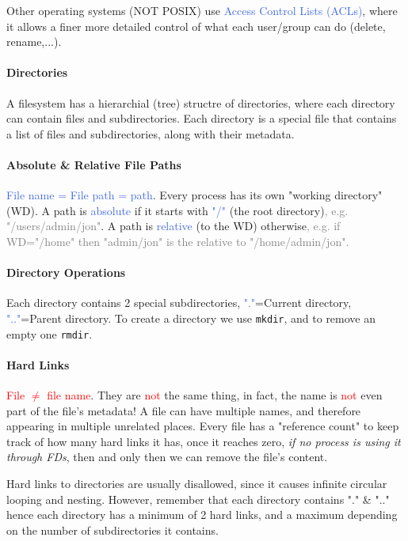 \documentclass[openany,12pt]{book}
\newcommand{\code}[1]{\texttt{#1}}
\newcommand{\red}[1]{\textcolor{Red}{#1}}
\newcommand{\blue}[1]{\textcolor{RoyalBlue}{#1}}
\newcommand{\gray}[1]{\textcolor{gray}{#1}}
\begin{document}
Other operating systems (NOT POSIX) use \blue{Access Control Lists (ACLs)}, where it allows a finer more detailed control of what each user/group can do (delete, rename,...).


\paragraph{Directories} A filesystem has a hierarchial (tree) structre of directories, where each directory can contain files and subdirectories. Each directory is a special file that contains a list of files and subdirectories, along with their metadata. 

\paragraph{Absolute \& Relative File Paths} \blue{File name = File path = path}. Every process has its own "working directory" (WD). A path is \blue{absolute} if it starts with \blue{"/"} (the root directory)\gray{, e.g. "/users/admin/jon"}. A path is \blue{relative} (to the WD) otherwise\gray{, e.g. if WD="/home" then "admin/jon" is the relative to "/home/admin/jon".}


\paragraph{Directory Operations} Each directory contains 2 special subdirectories, \blue{"."}=Current directory, \blue{".."}=Parent directory. To create a directory we use \code{mkdir}, and to remove an empty one \code{rmdir}.



\paragraph{Hard Links} \red{File \(\neq\) file name}. They are \red{not} the same thing, in fact, the name is \red{not} even part of the file's metadata! A file can have multiple names, and therefore appearing in multiple unrelated places. Every file has a "reference count" to keep track of how many hard links it has, once it reaches zero, \textit{if no process is using it through FDs}, then and only then we can remove the file's content. 

Hard links to directories are usually disallowed, since it causes infinite circular looping and nesting. However, remember that each directory contains "." \& ".." hence each directory has a minimum of 2 hard links, and a maximum depending on the number of subdirectories it contains.
\end{document}
